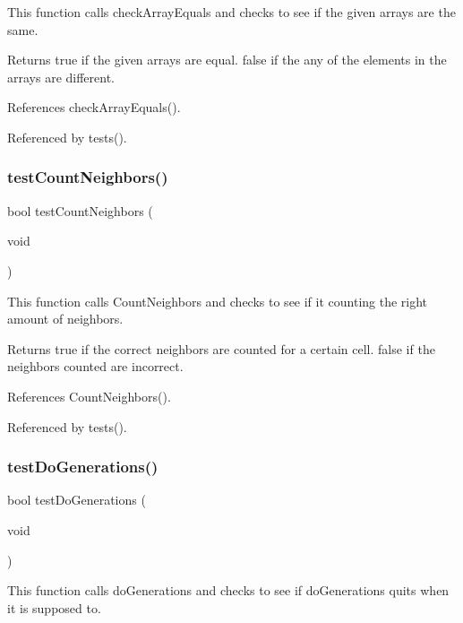 This function calls check\+Array\+Equals and checks to see if the given arrays are the same.

\begin{DoxyReturn}{Returns}
true if the given arrays are equal. false if the any of the elements in the arrays are different. 
\end{DoxyReturn}


References check\+Array\+Equals().



Referenced by tests().

\mbox{\label{tests_8c_a75eb3d149c9fa363b42cccfb3d53a65a}} 
\subsubsection{test\+Count\+Neighbors()}
{\footnotesize\ttfamily bool test\+Count\+Neighbors (\begin{DoxyParamCaption}\item[{void}]{ }\end{DoxyParamCaption})}

This function calls Count\+Neighbors and checks to see if it counting the right amount of neighbors.

\begin{DoxyReturn}{Returns}
true if the correct neighbors are counted for a certain cell. false if the neighbors counted are incorrect. 
\end{DoxyReturn}


References Count\+Neighbors().



Referenced by tests().

\mbox{\label{tests_8c_a9064028f30ed56e9fc83c749eb75362f}} 
\subsubsection{test\+Do\+Generations()}
{\footnotesize\ttfamily bool test\+Do\+Generations (\begin{DoxyParamCaption}\item[{void}]{ }\end{DoxyParamCaption})}

This function calls do\+Generations and checks to see if do\+Generations quits when it is supposed to.

